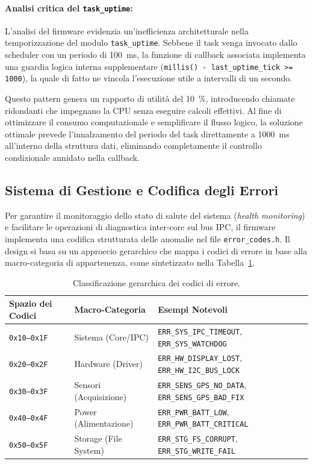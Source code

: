 \paragraph{Analisi critica del \texttt{task\_uptime}:}
L'analisi del firmware evidenzia un'inefficienza architetturale nella temporizzazione del modulo \texttt{task\_uptime}. Sebbene il task venga invocato dallo scheduler con un periodo di \qty{100}{ms}, la funzione di callback associata implementa una guardia logica interna supplementare (\texttt{millis() - last\_uptime\_tick >= 1000}), la quale di fatto ne vincola l'esecuzione utile a intervalli di un secondo. 

Questo pattern genera un rapporto di utilità del \qty{10}{\%}, introducendo chiamate ridondanti che impegnano la CPU senza eseguire calcoli effettivi. Al fine di ottimizzare il consumo computazionale e semplificare il flusso logico, la soluzione ottimale prevede l'innalzamento del periodo del task direttamente a \qty{1000}{ms} all'interno della struttura dati, eliminando completamente il controllo condizionale annidato nella callback.

\subsection{Sistema di Gestione e Codifica degli Errori}

Per garantire il monitoraggio dello stato di salute del sistema (\textit{health monitoring}) e facilitare le operazioni di diagnostica inter-core sul bus IPC, il firmware implementa una codifica strutturata delle anomalie nel file \texttt{error\_codes.h}. Il design si basa su un approccio gerarchico che mappa i codici di errore in base alla macro-categoria di appartenenza, come sintetizzato nella Tabella~\ref{tab:error_categories}.

\begin{table}[htbp]
\centering
\caption{Classificazione gerarchica dei codici di errore.}
\label{tab:error_categories}
\begin{tabularx}{\textwidth}{@{}l l X@{}}
    \toprule
    \textbf{Spazio dei Codici} & \textbf{Macro-Categoria} & \textbf{Esempi Notevoli} \\
    \midrule
    \texttt{0x10--0x1F} & Sistema (Core/IPC)  & \texttt{ERR\_SYS\_IPC\_TIMEOUT}, \texttt{ERR\_SYS\_WATCHDOG} \\
    \texttt{0x20--0x2F} & Hardware (Driver)   & \texttt{ERR\_HW\_DISPLAY\_LOST}, \texttt{ERR\_HW\_I2C\_BUS\_LOCK} \\
    \texttt{0x30--0x3F} & Sensori (Acquisizione)& \texttt{ERR\_SENS\_GPS\_NO\_DATA}, \texttt{ERR\_SENS\_GPS\_BAD\_FIX} \\
    \texttt{0x40--0x4F} & Power (Alimentazione)& \texttt{ERR\_PWR\_BATT\_LOW}, \texttt{ERR\_PWR\_BATT\_CRITICAL} \\
    \texttt{0x50--0x5F} & Storage (File System)& \texttt{ERR\_STG\_FS\_CORRUPT}, \texttt{ERR\_STG\_WRITE\_FAIL} \\
    \bottomrule
\end{tabularx}
\end{table}

